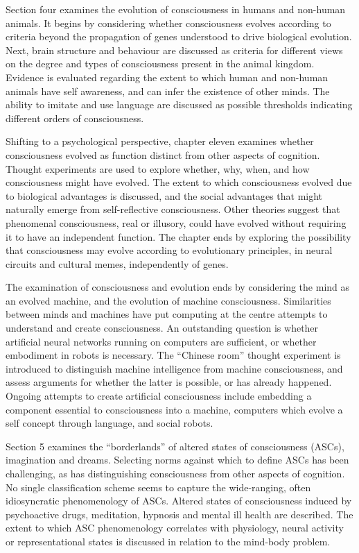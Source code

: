 \documentclass[a4paper]{article}
\begin{document}
Section four examines the evolution of consciousness in humans and non-human
animals. It begins by considering whether consciousness evolves according to
criteria beyond the propagation of genes understood to drive biological
evolution. Next, brain structure and behaviour are discussed as criteria for
different views on the degree and types of consciousness present in the animal
kingdom. Evidence is evaluated regarding the extent to which human and
non-human animals have self awareness, and can infer the existence of other
minds. The ability to imitate and use language are discussed as possible
thresholds indicating different orders of consciousness.

Shifting to a psychological perspective, chapter eleven examines whether
consciousness evolved as function distinct from other aspects of cognition.
Thought experiments are used to explore whether, why, when, and how
consciousness might have evolved. The extent to which consciousness evolved
due to biological advantages is discussed, and the social advantages that
might naturally emerge from self-reflective consciousness. Other theories
suggest that phenomenal consciousness, real or illusory, could have evolved
without requiring it to have an independent function. The chapter ends by
exploring the possibility that consciousness may evolve according to
evolutionary principles, in neural circuits and cultural memes, independently
of genes.

The examination of consciousness and evolution ends by considering the mind as
an evolved machine, and the evolution of machine consciousness. Similarities
between minds and machines have put computing at the centre attempts to
understand and create consciousness. An outstanding question is whether
artificial neural networks running on computers are sufficient, or whether
embodiment in robots is necessary. The ``Chinese room'' thought experiment is
introduced to distinguish machine intelligence from machine consciousness, and
assess arguments for whether the latter is possible, or has already happened.
Ongoing attempts to create artificial consciousness include embedding a
component essential to consciousness into a machine, computers which evolve a
self concept through language, and social robots.

Section 5 examines the ``borderlands'' of altered states of consciousness
(ASCs), imagination and dreams. Selecting norms against which to define ASCs
has been challenging, as has distinguishing consciousness from other aspects
of cognition. No single classification scheme seems to capture the
wide-ranging, often idiosyncratic phenomenology of ASCs. Altered states of
consciousness induced by psychoactive drugs, meditation, hypnosis and mental
ill health are described. The extent to which ASC phenomenology correlates
with physiology, neural activity or representational states is discussed in
relation to the mind-body problem.
\end{document}
